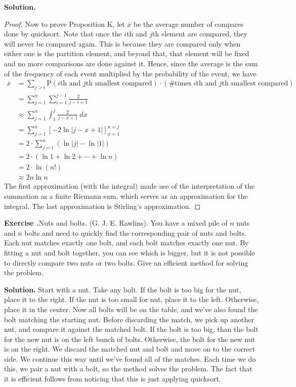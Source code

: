 \documentclass[12pt, a4paper]{article}
\newcommand{\prob}{\text{P}}
\newenvironment{ex}[2][Exercise]
{\par\medskip\noindent \textbf{#1 #2.}}
{\medskip}
\newenvironment{sol}[1][Solution]
{\par\medskip\noindent \textbf{#1.} }
{\medskip}
\begin{document}
\begin{sol}
\begin{proof}
			Now to prove Proposition K, let $\overline{x}$ be the average number of compares
			done by quicksort. Note that once the $i$th and $j$th element are compared,
			they will never be compared again. This is because they are compared only when
			either one is the partition element, and beyond that, that element will be
			fixed and no more comparisons are done against it. Hence, since the
			average is the sum of the frequency of each event multiplied by the probability
			of the event, we have
			\begin{align*}
				\overline{x} &= \sum_{j>i}\prob(\text{$i$th and $j$th smallest compared})\cdot
				(\text{\# times $i$th and $j$th smallest compared})\\
				&=\sum_{j=1}^{n}\sum_{i=1}^{j-1}\frac{2}{j-i+1}\\
				&\approx \sum_{j=1}^{n}\int_{1}^{j}\frac{2}{j-x+1}\ dx\\
				&=\sum_{j=1}^{n}[-2\ln|j-x+1|]_{x=1}^{x=j}\\
				&=2\cdot \sum_{j=1}^{n}(\ln|j|-\ln|1|)\\
				&=2\cdot (\ln 1 + \ln 2 + \cdots+\ln n)\\
				&=2\cdot \ln(n!)\\
				&\approx 2n\ln n
			\end{align*}
			The first approximation (with the integral) made use of the interpretation
			of the summation as a finite Riemann sum, which serves as an approximation
			for the integral. The last approximation is Stirling's approximation.
		\end{proof}
	\end{sol}
	\begin{ex}{15}
		\emph{Nuts and bolts}. (G. J. E. Rawlins). You have a mixed pile of $n$ nuts
		and $n$ bolts and need to quickly find the corresponding pair of nuts and bolts.
		Each nut matches exactly one bolt, and each bolt matches exactly one nut.
		By fitting a nut and bolt together, you can see which is bigger, but it is not
		possible to directly compare two nuts or two bolts. Give an efficient
		method for solving the problem.
	\end{ex}
	\begin{sol}
		Start with a nut. Take any bolt. If the bolt is too big for the nut, place
		it to the right. If the nut is too small for nut, place it to the left. Otherwise,
		place it in the center. Now all bolts will be on the table, and we've also
		found the bolt matching the starting nut. Before discarding the match,
		we pick up another nut, and compare it against the matched bolt. If the bolt
		is too big, than the bolt for the new nut is on the left bunch of bolts.
		Otherwise, the bolt for the new nut is on the right. We discard the matched
		nut and bolt and move on to the correct side. We continue this way until we've
		found all of the matches. Each time we do this, we pair a nut with a bolt, so
		the method solves the problem. The fact that it is efficient follows from
		noticing that this is just applying quicksort.
	\end{sol}
\end{document}
